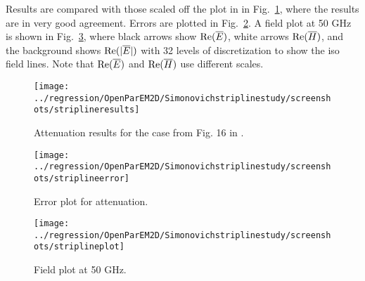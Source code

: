 \documentclass[titlepage]{article}
\renewcommand\_{\textunderscore\linebreak[1]}
\begin{document}
Results are compared with those scaled off the plot in \cite{Simonovich} in Fig.~\ref{fig:stripline_results}, where the results are in very good agreement.  Errors are plotted in Fig.~\ref{fig:stripline_error}. A field plot at 50 GHz is shown in Fig.~\ref{fig:stripline_plot}, where black arrows show $\textnormal{Re}(\overline{E})$, white arrows $\textnormal{Re}(\overline{H})$, and the background shows $\textnormal{Re}(|\overline{E}|)$ with 32 levels of discretization to show the iso field lines. Note that $\textnormal{Re}(\overline{E})$ and $\textnormal{Re}(\overline{H})$ use different scales.
\begin{figure}[H]
  \centering
  \texttt{[image: ../regression/OpenParEM2D/Simonovich\_stripline\_study/screenshots/stripline\_results]}
  \caption{Attenuation results for the case from Fig. 16 in \cite{Simonovich}.}
  \label{fig:stripline_results}
\end{figure}
\begin{figure}[H]
  \centering
  \texttt{[image: ../regression/OpenParEM2D/Simonovich\_stripline\_study/screenshots/stripline\_error]}
  \caption{Error plot for attenuation.}
  \label{fig:stripline_error}
\end{figure}
\begin{figure}[H]
  \centering
  \texttt{[image: ../regression/OpenParEM2D/Simonovich\_stripline\_study/screenshots/stripline\_plot]}
  \caption{Field plot at 50 GHz.}
  \label{fig:stripline_plot}
\end{figure}
\end{document}
